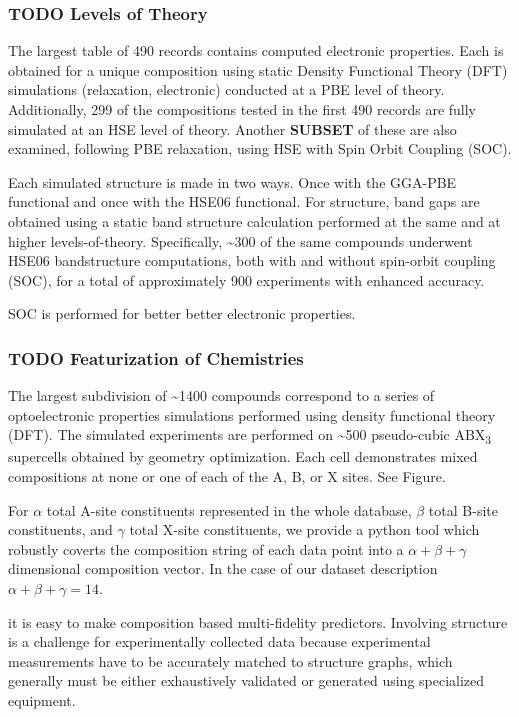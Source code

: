 \documentclass[aip, jmp, amsmath, amssymb]{revtex4-2}
\begin{document}
\subsubsection*{{\bfseries\sffamily TODO} Levels of Theory}
\label{sec:org2ea2fd8}
The largest table of 490 records contains computed electronic
properties. Each is obtained for a unique composition using static
Density Functional Theory (DFT) simulations (relaxation, electronic)
conducted at a PBE level of theory. Additionally, 299 of the
compositions tested in the first 490 records are fully simulated at an
HSE level of theory. Another \textbf{SUBSET} of these are also examined,
following PBE relaxation, using HSE with Spin Orbit Coupling (SOC).

Each simulated structure is made in two ways. Once with the GGA-PBE
functional and once with the HSE06 functional. For structure, band
gaps are obtained using a static band structure calculation performed
at the same and at higher levels-of-theory. Specifically, \textasciitilde{}300 of the
same compounds underwent HSE06 bandstructure computations, both with
and without spin-orbit coupling (SOC), for a total of approximately
900 experiments with enhanced accuracy.

SOC is performed for better better electronic properties.

\subsubsection*{{\bfseries\sffamily TODO} Featurization of Chemistries}
\label{sec:org75662a0}
The largest subdivision of \textasciitilde{}1400 compounds correspond to a series of
optoelectronic properties simulations performed using density
functional theory (DFT). The simulated experiments are performed on
\textasciitilde{}500 pseudo-cubic ABX\textsubscript{3} supercells obtained by geometry
optimization. Each cell demonstrates mixed compositions at none or one
of each of the A, B, or X sites. See Figure.

For \(\alpha\) total A-site constituents represented in the whole
database, \(\beta\) total B-site constituents, and \(\gamma\) total X-site
constituents, we provide a python tool which robustly coverts the
composition string of each data point into a \(\alpha + \beta +
\gamma\) dimensional composition vector. In the case of our dataset
description \cite{yang-2022-high-throug} \(\alpha + \beta + \gamma =
14\).

it is easy to make composition based multi-fidelity
predictors. Involving structure is a challenge for experimentally
collected data because experimental measurements have to be accurately
matched to structure graphs, which generally must be either
exhaustively validated or generated using specialized equipment.
\end{document}
